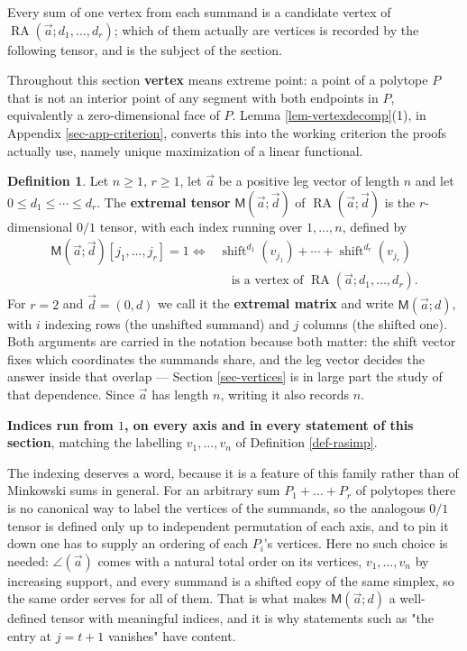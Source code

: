 \documentclass[11pt, a4paper, abstract=yes]{scrartcl}
\theoremstyle{definition}
\newtheorem{definition}{Definition}
\theoremstyle{remark}
\theoremstyle{plain}
\newcommand{\shift}{\operatorname{shift}}
\newcommand{\rasimp}{\angle}
\newcommand{\RA}{\operatorname{RA}}
\newcommand{\extten}{\mathsf{M}}
\begin{document}
Every sum of one vertex from each summand is a candidate vertex of \(\RA(\vec a;d_1,\dots,d_r)\);
which of them actually are vertices is recorded by the following tensor, and is the subject of the
section.

Throughout this section \textbf{vertex} means extreme point: a point of a polytope \(P\) that is not an
interior point of any segment with both endpoints in \(P\), equivalently a zero-dimensional face of
\(P\). Lemma \ref{lem-vertexdecomp}(1), in Appendix \ref{sec-app-criterion}, converts this into the
working criterion the proofs actually use, namely
unique maximization of a linear functional.

\begin{definition}
Let \(n\ge1\), \(r\ge1\), let \(\vec a\) be a positive leg vector of length \(n\) and let
\(0\le d_1\le\cdots\le d_r\). The \textbf{extremal tensor} \(\extten(\vec a;\vec d)\) of
\(\RA(\vec a;\vec d)\) is the \(r\)-dimensional \(0/1\) tensor, with each index running over
\(1,\dots,n\), defined by
\begin{equation}\label{eq:extten}
\begin{split}
  \extten(\vec a;\vec d)[j_1,\dots,j_r]=1 \iff{}
    &\shift^{d_1}(v_{j_1})+\cdots+\shift^{d_r}(v_{j_r})\\
    &\quad\text{is a vertex of }\RA(\vec a;d_1,\dots,d_r).
\end{split}
\end{equation}
For \(r=2\) and \(\vec d=(0,d)\) we call it the \textbf{extremal matrix} and write \(\extten(\vec a;d)\),
with \(i\) indexing rows (the unshifted summand) and \(j\) columns (the shifted one).
Both arguments are carried in the notation because both matter: the shift vector fixes which
coordinates the summands share, and the leg vector decides the answer inside that overlap ---
Section \ref{sec-vertices} is in large part the study of that dependence. Since \(\vec a\) has length
\(n\), writing it also records \(n\).
\label{def-extten}
\end{definition}

\textbf{Indices run from \(1\), on every axis and in every statement of this section}, matching the
labelling \(v_1,\dots,v_n\) of Definition \ref{def-rasimp}.

The indexing deserves a word, because it is a feature of this family rather than of Minkowski sums
in general. For an arbitrary sum \(P_1+\dots+P_r\) of polytopes there is no canonical way to label
the vertices of the summands, so the analogous \(0/1\) tensor is defined only up to independent
permutation of each axis, and to pin it down one has to supply an ordering of each \(P_i\)'s
vertices. Here no such choice is needed: \(\rasimp(\vec a)\) comes with a natural total order on its
vertices, \(v_1,\dots,v_n\) by increasing support, and every summand is a shifted copy of the same
simplex, so the same order serves for all of them. That is what makes \(\extten(\vec a;d)\) a well-defined tensor
with meaningful indices, and it is why statements such as "the entry at \(j=t+1\) vanishes" have
content.
\end{document}
